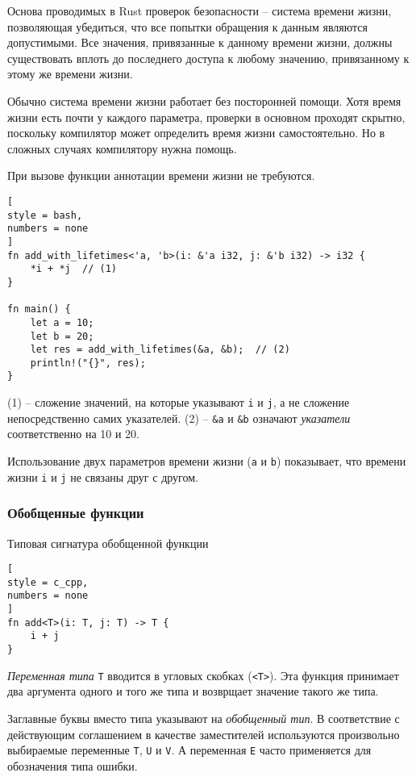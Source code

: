 \documentclass[%
	11pt,
	a4paper,
	utf8,
		]{article}
\begin{document}
Основа проводимых в Rust проверок безопасности -- система времени жизни, позволяющая убедиться, что все попытки обращения к данным являются допустимыми. Все значения, привязанные к данному времени жизни, должны существовать вплоть до последнего доступа к любому значению, привязанному к этому же времени жизни.

Обычно система времени жизни работает без посторонней помощи. Хотя время жизни есть почти у каждого параметра, проверки в основном проходят скрытно, поскольку компилятор может определить время жизни самостоятельно. Но в сложных случаях компилятору нужна помощь.

При вызове функции аннотации времени жизни не требуются. 
\begin{lstlisting}[
style = bash,
numbers = none
]
fn add_with_lifetimes<'a, 'b>(i: &'a i32, j: &'b i32) -> i32 {
    *i + *j  // (1)
}

fn main() {
    let a = 10;
    let b = 20;
    let res = add_with_lifetimes(&a, &b);  // (2)
    println!("{}", res);
}
\end{lstlisting}

(1) -- сложение значений, на которые указывают \texttt{i} и \texttt{j}, а не сложение непосредственно самих указателей. (2) -- \verb|&a| и \verb|&b| означают \emph{указатели} соответственно на 10 и 20.

Использование двух параметров времени жизни (\texttt{a} и \texttt{b}) показывает, что времени жизни \texttt{i} и \texttt{j} не связаны друг с другом.

\subsubsection{Обобщенные функции}

Типовая сигнатура обобщенной функции
\begin{lstlisting}[
style = c_cpp,
numbers = none
]
fn add<T>(i: T, j: T) -> T {
    i + j
}
\end{lstlisting}

\emph{Переменная типа} \texttt{T} вводится в угловых скобках (\verb|<T>|). Эта функция принимает два аргумента одного и того же типа и возврщает значение такого же типа.

Заглавные буквы вместо типа указывают на \emph{обобщенный тип}. В соответствие с действующим соглашением в качестве заместителей используются произвольно выбираемые переменные \texttt{T}, \texttt{U} и \texttt{V}. А переменная \texttt{E} часто применяется для обозначения типа ошибки.
\end{document}
